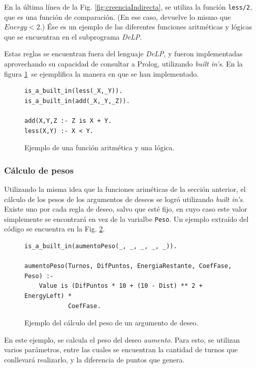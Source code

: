 \documentclass[oneside]{book}
\theoremstyle{definition}
\theoremstyle{example}
\begin{document}
En la última línea de la Fig. \ref{fig:creenciaIndirecta}, se utiliza la función 
\texttt{less/2}, que es una función de comparación. (En ese caso, devuelve lo mismo
que $Energy < 2$.) Ése es un ejemplo de las diferentes funciones aritméticas y 
lógicas que se encuentran en el subprograma \textit{DeLP}.

Estas reglas se encuentran fuera del lenguaje \textit{DeLP}, y fueron implementadas 
aprovechando su capacidad de consultar a Prolog, utilizando \textit{built in's}.
En la figura \ref{fig:funciones}\ se ejemplifica la manera en que se han 
implementado.

\begin{figure}
\begin{verbatim}    
is_a_built_in(less(_X,_Y)).
is_a_built_in(add(_X,_Y,_Z)).

add(X,Y,Z :- Z is X + Y.
less(X,Y) :- X < Y.
\end{verbatim}

\caption{Ejemplo de una función aritmética y una lógica.}
\label{fig:funciones}
\end{figure}

\subsubsection{Cálculo de pesos}

Utilizando la misma idea que la funciones ariméticas de la sección anterior, el
cálculo de los pesos de los argumentos de deseos se logró utilizando \textit{built 
in's}. Existe uno por cada regla de deseo, salvo que esté fijo, en cuyo caso 
este valor simplemente se encontrará en vez de la varialbe \texttt{Peso}. Un 
ejemplo extraído del código se encuentra en la Fig. \ref{fig:calculoDePeso}.

\begin{figure}
\begin{verbatim}
is_a_built_in(aumentoPeso(_, _, _, _, _)).

aumentoPeso(Turnos, DifPuntos, EnergiaRestante, CoefFase, Peso) :-
    Value is (DifPuntos * 10 + (10 - Dist) ** 2 + EnergyLeft) * 
    		CoefFase.
\end{verbatim}

\caption{Ejemplo del cálculo del peso de un argumento de deseo.}
\label{fig:calculoDePeso}
\end{figure}

En este ejemplo, se calcula el peso del deseo \emph{aumento}. Para esto, se utilizan
varios parámetros, entre las cuales se encuentran la cantidad de turnos que 
conllevará realizarlo, y la diferencia de puntos que genera.
\end{document}
